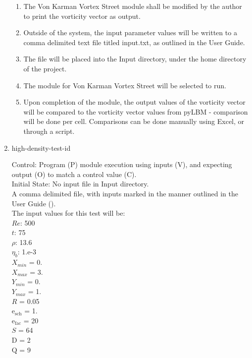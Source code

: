 \documentclass[12pt, titlepage]{article}
\newcounter{testcounter} %
\begin{document}
\begin{enumerate}
\begin{enumerate}
\item The Von Karman Vortex Street module shall be modified by the author to print the vorticity vector as output.
\item Outside of the system, the input parameter values will be written to a comma delimited text file titled input.txt, as outlined in the User Guide.
\item The file will be placed into the Input directory, under the home directory of the project.
\item The module for Von Karman Vortex Street will be selected to run.
\item Upon completion of the module, the output values of the vorticity vector will be compared to the vorticity vector values from pyLBM - comparison will be done per cell. Comparisons can be done manually using Excel, or through a script.\\
\end{enumerate}

\item{high-density-test-id\thetestcounter \\}

Control: Program (P) module execution using inputs (V), and expecting output (O) to match a control value (C).\\
					
Initial State: No input file in Input directory.\\
					
A comma delimited file, with inputs marked in the manner outlined in the User Guide (\citet{LBM_UserGuide_PM}).\\The input values for this test will be:\\
$Re$: 500\\
$t$: 75\\
$\rho$: 13.6\\
$\eta_b$: 1.e-3\\
$X_{min}$ = 0.\\
$X_{max}$ = 3.\\
$Y_{min}$ = 0.\\
$Y_{max}$ = 1.\\
$R$ = 0.05\\
$\mathrm{e_{sch}}$ = 1.\\
$\mathrm{e_{fac}}$ = 20\\
$S$ = 64\\
$\mathrm{D}$ = 2\\
$\mathrm{Q}$ = 9\\


\end{enumerate}
\end{document}
